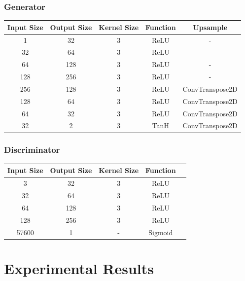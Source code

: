 \documentclass{article}
\begin{document}
\subsubsection{Generator}

\begin{center}
    \begin{tabular}{ |c|c|c|c|c| } 
    \hline
    Input Size & Output Size & Kernel Size & Function & Upsample \\
    \hline
    1 & 32 & 3 & ReLU & - \\ 
    32 & 64 & 3 & ReLU & - \\ 
    64 & 128 & 3 & ReLU &  - \\ 
    128 & 256 & 3 & ReLU & - \\ 
    256 & 128 & 3 & ReLU & ConvTranspose2D \\ 
    128 & 64 & 3 & ReLU & ConvTranspose2D \\ 
    64 & 32 & 3 & ReLU & ConvTranspose2D \\ 
    32 & 2 & 3 & TanH & ConvTranspose2D \\ 

    \hline
    \end{tabular}
\end{center}

\subsubsection{Discriminator}

\begin{center}
    \begin{tabular}{ |c|c|c|c|c| } 
    \hline
    Input Size & Output Size & Kernel Size & Function  \\
    \hline
    3 & 32 & 3 & ReLU \\ 
    32 & 64 & 3 & ReLU  \\ 
    64 & 128 & 3 & ReLU \\ 
    128 & 256 & 3 & ReLU  \\ 
    57600 & 1 & - & Sigmoid  \\ 

    \hline
    \end{tabular}
\end{center}

\section{Experimental Results}
\end{document}
